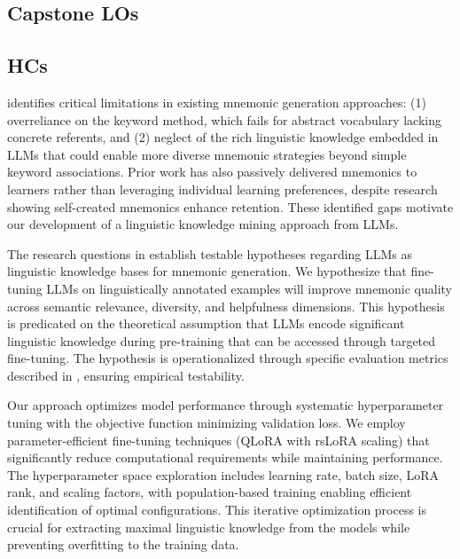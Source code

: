 \subsection{Capstone LOs} \label{sec:capstone-los}
 

\subsection{HCs} \label{sec:hcs}
  identifies critical limitations in existing mnemonic generation approaches: (1) overreliance on the keyword method, which fails for abstract vocabulary lacking concrete referents, and (2) neglect of the rich linguistic knowledge embedded in LLMs that could enable more diverse mnemonic strategies beyond simple keyword associations. Prior work has also passively delivered mnemonics to learners rather than leveraging individual learning preferences, despite research showing self-created mnemonics enhance retention. These identified gaps motivate our development of a linguistic knowledge mining approach from LLMs.

 The research questions in  establish testable hypotheses regarding LLMs as linguistic knowledge bases for mnemonic generation. We hypothesize that fine-tuning LLMs on linguistically annotated examples will improve mnemonic quality across semantic relevance, diversity, and helpfulness dimensions. This hypothesis is predicated on the theoretical assumption that LLMs encode significant linguistic knowledge during pre-training that can be accessed through targeted fine-tuning. The hypothesis is operationalized through specific evaluation metrics described in , ensuring empirical testability.

 Our approach optimizes model performance through systematic hyperparameter tuning with the objective function minimizing validation loss. We employ parameter-efficient fine-tuning techniques (QLoRA with rsLoRA scaling) that significantly reduce computational requirements while maintaining performance. The hyperparameter space exploration includes learning rate, batch size, LoRA rank, and scaling factors, with population-based training enabling efficient identification of optimal configurations. This iterative optimization process is crucial for extracting maximal linguistic knowledge from the models while preventing overfitting to the training data.

